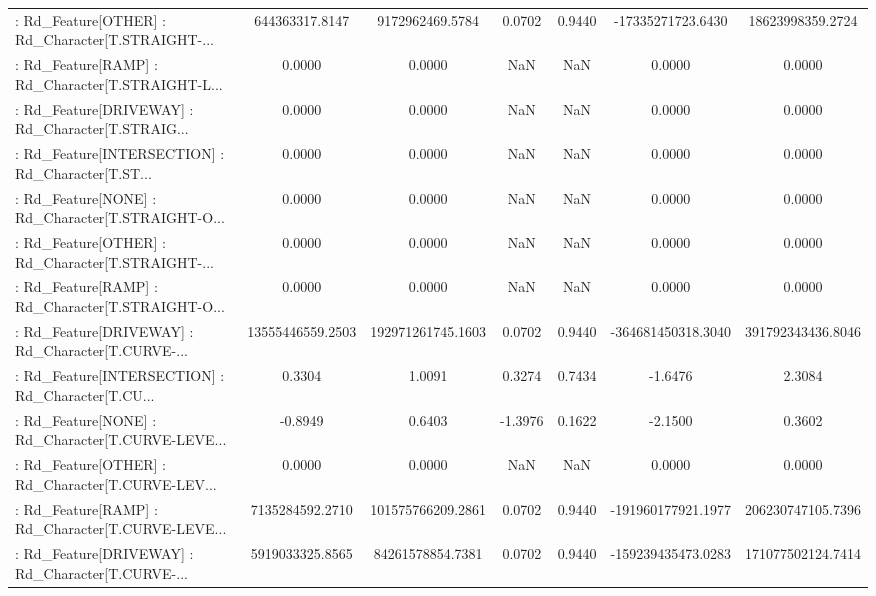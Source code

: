 \begin{longtable}{p{4cm}cccccc}
 : Rd\_Feature[OTHER] : Rd\_Character[T.STRAIGHT-... &    644363317.8147 &   9172962469.5784 &  0.0702 &       0.9440 &  -17335271723.6430 &  18623998359.2724 \\
 : Rd\_Feature[RAMP] : Rd\_Character[T.STRAIGHT-L... &            0.0000 &            0.0000 &     NaN &          NaN &             0.0000 &            0.0000 \\
 : Rd\_Feature[DRIVEWAY] : Rd\_Character[T.STRAIG... &            0.0000 &            0.0000 &     NaN &          NaN &             0.0000 &            0.0000 \\
 : Rd\_Feature[INTERSECTION] : Rd\_Character[T.ST... &            0.0000 &            0.0000 &     NaN &          NaN &             0.0000 &            0.0000 \\
 : Rd\_Feature[NONE] : Rd\_Character[T.STRAIGHT-O... &            0.0000 &            0.0000 &     NaN &          NaN &             0.0000 &            0.0000 \\
 : Rd\_Feature[OTHER] : Rd\_Character[T.STRAIGHT-... &            0.0000 &            0.0000 &     NaN &          NaN &             0.0000 &            0.0000 \\
 : Rd\_Feature[RAMP] : Rd\_Character[T.STRAIGHT-O... &            0.0000 &            0.0000 &     NaN &          NaN &             0.0000 &            0.0000 \\
 : Rd\_Feature[DRIVEWAY] : Rd\_Character[T.CURVE-... &  13555446559.2503 & 192971261745.1603 &  0.0702 &       0.9440 & -364681450318.3040 & 391792343436.8046 \\
 : Rd\_Feature[INTERSECTION] : Rd\_Character[T.CU... &            0.3304 &            1.0091 &  0.3274 &       0.7434 &            -1.6476 &            2.3084 \\
 : Rd\_Feature[NONE] : Rd\_Character[T.CURVE-LEVE... &           -0.8949 &            0.6403 & -1.3976 &       0.1622 &            -2.1500 &            0.3602 \\
 : Rd\_Feature[OTHER] : Rd\_Character[T.CURVE-LEV... &            0.0000 &            0.0000 &     NaN &          NaN &             0.0000 &            0.0000 \\
 : Rd\_Feature[RAMP] : Rd\_Character[T.CURVE-LEVE... &   7135284592.2710 & 101575766209.2861 &  0.0702 &       0.9440 & -191960177921.1977 & 206230747105.7396 \\
 : Rd\_Feature[DRIVEWAY] : Rd\_Character[T.CURVE-... &   5919033325.8565 &  84261578854.7381 &  0.0702 &       0.9440 & -159239435473.0283 & 171077502124.7414 \\

\end{longtable}
